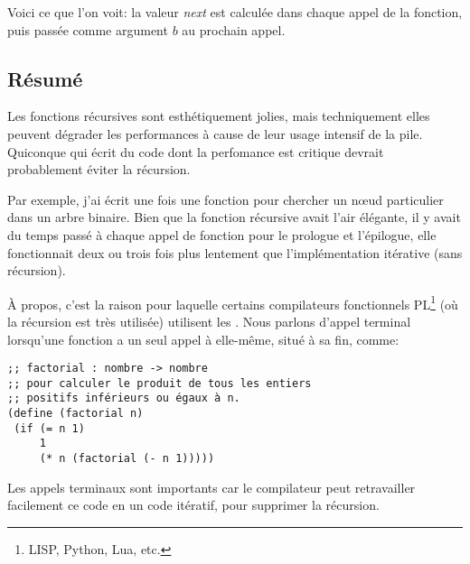 

Voici ce que l'on voit: la valeur \emph{next} est calculée dans chaque appel de la fonction,
puis passée comme argument $b$ au prochain appel.

\subsection{Résumé}

\label{Recursion_and_tail_call}
\myindex{\Recursion}
Les fonctions récursives sont esthétiquement jolies, mais techniquement elles
peuvent dégrader les performances à cause de leur usage intensif de la pile.
Quiconque qui écrit du code dont la perfomance est critique devrait probablement
éviter la récursion.

Par exemple, j'ai écrit une fois une fonction pour chercher un n\oe{}ud particulier
dans un arbre binaire.
Bien que la fonction récursive avait l'air élégante, il y avait du temps passé à
chaque appel de fonction pour le prologue et l'épilogue, elle fonctionnait deux ou
trois fois plus lentement que l'implémentation itérative (sans récursion).

\newcommand{\FnFP}{\footnote{LISP, Python, Lua, etc.}}

À propos, c'est la raison pour laquelle certains compilateurs fonctionnels \ac{PL}\FnFP{}
(où la récursion est très utilisée) utilisent les .
Nous parlons d'appel terminal lorsqu'une fonction a un seul appel à elle-même, situé
à sa fin, comme:

\begin{lstlisting}[caption=Scheme{,} exemple copié/collé depuis Wikipédia]
;; factorial : nombre -> nombre
;; pour calculer le produit de tous les entiers
;; positifs inférieurs ou égaux à n.
(define (factorial n)
 (if (= n 1)
     1
	 (* n (factorial (- n 1)))))
\end{lstlisting}

Les appels terminaux sont importants car le compilateur peut retravailler facilement
ce code en un code itératif, pour supprimer la récursion.

